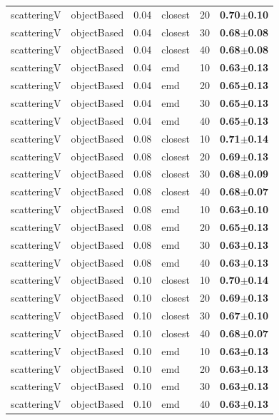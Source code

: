 \documentclass[12pt,a4paper,fleqn]{tufte-handout}
\begin{document}
\begin{table}
\begin{center}
\begin{tabular}{lllllc}
scatteringV & objectBased & 0.04 & closest & 20 & \textbf{0.70$\pm$0.10} \\   
scatteringV & objectBased & 0.04 & closest & 30 & \textbf{0.68$\pm$0.08} \\   
scatteringV & objectBased & 0.04 & closest & 40 & \textbf{0.68$\pm$0.08} \\   
scatteringV & objectBased & 0.04 & emd & 10 & \textbf{0.63$\pm$0.13} \\   
scatteringV & objectBased & 0.04 & emd & 20 & \textbf{0.65$\pm$0.13} \\   
scatteringV & objectBased & 0.04 & emd & 30 & \textbf{0.65$\pm$0.13} \\   
scatteringV & objectBased & 0.04 & emd & 40 & \textbf{0.65$\pm$0.13} \\   
scatteringV & objectBased & 0.08 & closest & 10 & \textbf{0.71$\pm$0.14} \\   
scatteringV & objectBased & 0.08 & closest & 20 & \textbf{0.69$\pm$0.13} \\   
scatteringV & objectBased & 0.08 & closest & 30 & \textbf{0.68$\pm$0.09} \\   
scatteringV & objectBased & 0.08 & closest & 40 & \textbf{0.68$\pm$0.07} \\   
scatteringV & objectBased & 0.08 & emd & 10 & \textbf{0.63$\pm$0.10} \\   
scatteringV & objectBased & 0.08 & emd & 20 & \textbf{0.65$\pm$0.13} \\   
scatteringV & objectBased & 0.08 & emd & 30 & \textbf{0.63$\pm$0.13} \\   
scatteringV & objectBased & 0.08 & emd & 40 & \textbf{0.63$\pm$0.13} \\   
scatteringV & objectBased & 0.10 & closest & 10 & \textbf{0.70$\pm$0.14} \\   
scatteringV & objectBased & 0.10 & closest & 20 & \textbf{0.69$\pm$0.13} \\   
scatteringV & objectBased & 0.10 & closest & 30 & \textbf{0.67$\pm$0.10} \\   
scatteringV & objectBased & 0.10 & closest & 40 & \textbf{0.68$\pm$0.07} \\   
scatteringV & objectBased & 0.10 & emd & 10 & \textbf{0.63$\pm$0.13} \\   
scatteringV & objectBased & 0.10 & emd & 20 & \textbf{0.63$\pm$0.13} \\   
scatteringV & objectBased & 0.10 & emd & 30 & \textbf{0.63$\pm$0.13} \\   
scatteringV & objectBased & 0.10 & emd & 40 & \textbf{0.63$\pm$0.13} \\   

\end{tabular}
\end{center}
\end{table}
\end{document}
